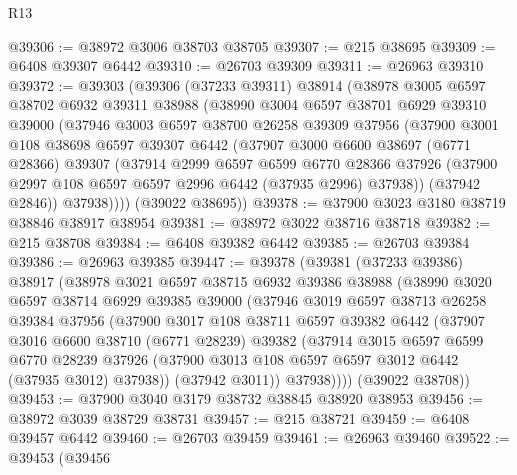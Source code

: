 \begin{lexlean}{R13}
\begin{coremodule}
@39306 := @38972 @3006 @38703 @38705
@39307 := @215 @38695
@39309 := @6408 @39307 @6442
@39310 := @26703 @39309
@39311 := @26963 @39310
@39372 := @39303
    (@39306
      (@37233 @39311)
      @38914
      (@38978
        @3005
        @6597
        @38702
        @6932
        @39311
        @38988
        (@38990
          @3004
          @6597
          @38701
          @6929
          @39310
          @39000
          (@37946
            @3003
            @6597
            @38700
            @26258
            @39309
            @37956
            (@37900
              @3001
              @108
              @38698
              @6597
              @39307
              @6442
              (@37907
                @3000
                @6600
                @38697
                (@6771 @28366)
                @39307
                (@37914
                  @2999
                  @6597
                  @6599
                  @6770
                  @28366
                  @37926
                  (@37900 @2997 @108 @6597 @6597 @2996 @6442 (@37935 @2996) @37938))
                (@37942 @2846))
              @37938))))
      (@39022 @38695))
@39378 := @37900 @3023 @3180 @38719 @38846 @38917 @38954
@39381 := @38972 @3022 @38716 @38718
@39382 := @215 @38708
@39384 := @6408 @39382 @6442
@39385 := @26703 @39384
@39386 := @26963 @39385
@39447 := @39378
    (@39381
      (@37233 @39386)
      @38917
      (@38978
        @3021
        @6597
        @38715
        @6932
        @39386
        @38988
        (@38990
          @3020
          @6597
          @38714
          @6929
          @39385
          @39000
          (@37946
            @3019
            @6597
            @38713
            @26258
            @39384
            @37956
            (@37900
              @3017
              @108
              @38711
              @6597
              @39382
              @6442
              (@37907
                @3016
                @6600
                @38710
                (@6771 @28239)
                @39382
                (@37914
                  @3015
                  @6597
                  @6599
                  @6770
                  @28239
                  @37926
                  (@37900 @3013 @108 @6597 @6597 @3012 @6442 (@37935 @3012) @37938))
                (@37942 @3011))
              @37938))))
      (@39022 @38708))
@39453 := @37900 @3040 @3179 @38732 @38845 @38920 @38953
@39456 := @38972 @3039 @38729 @38731
@39457 := @215 @38721
@39459 := @6408 @39457 @6442
@39460 := @26703 @39459
@39461 := @26963 @39460
@39522 := @39453
    (@39456

\end{coremodule}
\end{lexlean}
